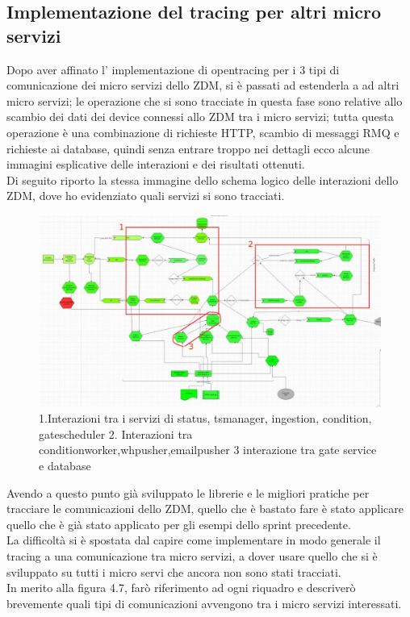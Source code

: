 \documentclass[a4paper,12pt,titlepage,italian,openany]{report}
\begin{document}
\subsection{Implementazione del tracing per altri micro servizi}
Dopo aver affinato l' implementazione di  opentracing per i 3 tipi di comunicazione dei micro servizi dello ZDM\cite{zdm:1}, si è passati ad estenderla a ad altri micro servizi;
le operazione che si sono tracciate in questa fase sono relative allo scambio dei dati dei device connessi allo ZDM\cite{zdm:1} tra i micro servizi; tutta questa operazione è una combinazione di richieste HTTP, scambio di messaggi RMQ e richieste ai database, quindi senza entrare troppo nei dettagli ecco alcune immagini esplicative delle interazioni e dei risultati ottenuti.\\
Di seguito riporto la stessa immagine dello schema logico delle interazioni dello ZDM\cite{zdm:1}, dove ho evidenziato quali servizi si sono tracciati.
\begin{figure}[H]
    \includegraphics[scale=0.3]{61.jpg}
    \centering
    \caption{1.Interazioni tra i servizi di status, tsmanager, ingestion, condition, gatescheduler 2. Interazioni tra conditionworker,whpusher,emailpusher 3 interazione tra gate service e database}
\end{figure}

Avendo a questo punto già sviluppato le librerie e le migliori pratiche per tracciare le comunicazioni dello ZDM\cite{zdm:1}, quello che è bastato fare è stato applicare quello che è già stato applicato per gli esempi dello sprint precedente.
\\ La difficoltà si è spostata dal capire come implementare in modo generale il tracing a una comunicazione tra micro servizi, a dover usare quello che si è sviluppato su tutti i micro servi che ancora non sono stati tracciati.\\
In merito alla figura 4.7, farò  riferimento ad ogni riquadro e descriverò brevemente quali tipi di comunicazioni avvengono tra i micro servizi interessati.
\end{document}

